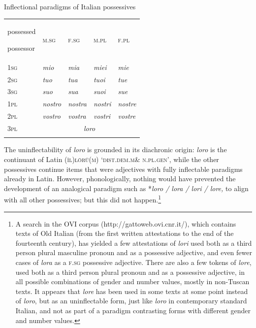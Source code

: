 \documentclass[output=paper]{langscibook}
\begin{document}
 Inflectional paradigms of Italian possessives


\begin{tabularx}{\textwidth}{XXXXX}

\lsptoprule

{\raggedleft possessed}

possessor & \textsc{m.sg} & \textsc{f.sg} & \textsc{m.pl} & \textsc{f.pl}\\
\textsc{1sg}  & \textit{mio} & \textit{mia} & \textit{miei} & \textit{mie}\\
\textsc{2sg}  & \textit{tuo} & \textit{tua} & \textit{tuoi} & \textit{tue}\\
\textsc{3sg}  & \textit{suo} & \textit{sua} & \textit{suoi} & \textit{sue}\\
\textsc{1pl}  & \textit{nostro} & \textit{nostra} & \textit{nostri} & \textit{nostre}\\
\textsc{2pl}  & \textit{vostro} & \textit{vostra} & \textit{vostri} & \textit{vostre}\\
\textsc{3pl}  & \multicolumn{4}{c}{\textit{loro}}\\
\lspbottomrule
\end{tabularx}
The uninflectability of \textit{loro} is grounded in its diachronic origin: \textit{loro} is the continuant of Latin \textsc{(ǐl)lōrŭ(m)} ‘\textsc{dist.dem.m\&} \textsc{n.pl.gen’,} while the other possessives continue items that were adjectives with fully inflectable paradigms already in Latin. However, phonologically, nothing would have prevented the development of an analogical paradigm such as *\textit{loro / lora / lori / lore,} to align with all other possessives; but this did not happen.\footnote{A search in the OVI corpus (http://gattoweb.ovi.cnr.it/), which contains texts of Old Italian (from the first written attestations to the end of the fourteenth century), has yielded a few attestations of \textit{lori} used both as a third person plural masculine pronoun and as a possessive adjective, and even fewer cases of \textit{lora} as a \textsc{f.sg} possessive adjective. There are also a few tokens of \textit{lore}, used both as a third person plural pronoun and as a possessive adjective, in all possible combinations of gender and number values, mostly in non-Tuscan texts. It appears that \textit{lore} has been used in some texts at some point instead of \textit{loro}, but as an uninflectable form, just like \textit{loro} in contemporary standard Italian, and not as part of a paradigm contrasting forms with different gender and number values.}
\end{document}
